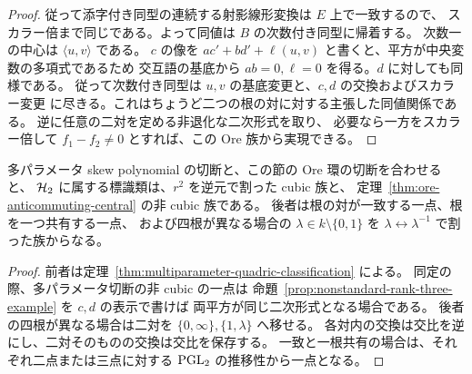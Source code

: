 \begin{proof}
従って添字付き同型の連続する射影線形変換は $E$ 上で一致するので、
スカラー倍まで同じである。よって同値は $B$ の次数付き同型に帰着する。
次数一の中心は $\langle u,v\rangle$ である。
$c$ の像を $a c'+b d'+\ell(u,v)$ と書くと、平方が中央変数の多項式であるため
交互語の基底から $ab=0,\ell=0$ を得る。$d$ に対しても同様である。
従って次数付き同型は $u,v$ の基底変更と、$c,d$ の交換およびスカラー変更
に尽きる。これはちょうど二つの根の対に対する主張した同値関係である。
逆に任意の二対を定める非退化な二次形式を取り、
必要なら一方をスカラー倍して $f_1-f_2\ne0$ とすれば、この Ore 族から実現できる。
\end{proof}

\begin{corollary}
多パラメータ skew polynomial の切断と、この節の Ore 環の切断を合わせると、
$\mathcal H_2$ に属する標識類は、$r^2$ を逆元で割った cubic 族と、
定理~\ref{thm:ore-anticommuting-central} の非 cubic 族である。
後者は根の対が一致する一点、根を一つ共有する一点、
および四根が異なる場合の $\lambda\in k\setminus\{0,1\}$ を
$\lambda\leftrightarrow\lambda^{-1}$ で割った族からなる。
\end{corollary}
\begin{proof}
前者は定理~\ref{thm:multiparameter-quadric-classification} による。
同定の際、多パラメータ切断の非 cubic の一点は
命題~\ref{prop:nonstandard-rank-three-example} を $c,d$ の表示で書けば
両平方が同じ二次形式となる場合である。
後者の四根が異なる場合は二対を $\{0,\infty\},\{1,\lambda\}$ へ移せる。
各対内の交換は交比を逆にし、二対そのものの交換は交比を保存する。
一致と一根共有の場合は、それぞれ二点または三点に対する
$\operatorname{PGL}_2$ の推移性から一点となる。
\end{proof}
